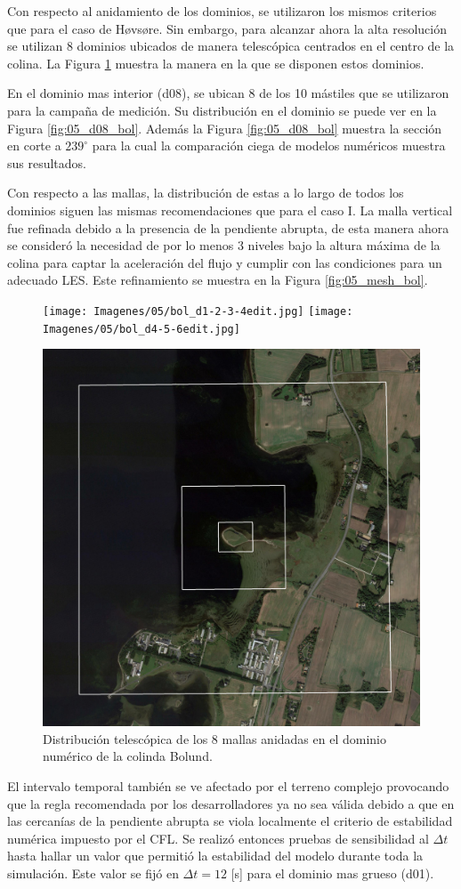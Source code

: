 Con respecto al anidamiento de los dominios, se utilizaron los mismos criterios que para el caso de Høvsøre. Sin embargo, para alcanzar ahora la alta resolución se utilizan 8 dominios ubicados de manera telescópica centrados en el centro de la colina. La Figura \ref{fig:05_dom_bol} muestra la manera en la que se disponen estos dominios.

En el dominio mas interior (d08), se ubican 8 de los 10 mástiles que se utilizaron para la campaña de medición. Su distribución en el dominio se puede ver en la Figura \ref{fig:05_d08_bol}. Además la Figura \ref{fig:05_d08_bol} muestra la sección en corte a $239^\circ$ para la cual la comparación ciega de modelos numéricos muestra sus resultados.

Con respecto a las mallas, la distribución de estas a lo largo de todos los dominios siguen las mismas recomendaciones que para el caso I. La malla vertical fue refinada debido a la presencia de la pendiente abrupta, de esta manera ahora se consideró la necesidad de por lo menos 3 niveles bajo la altura máxima de la colina para captar la aceleración del flujo y cumplir con las condiciones para un adecuado LES. Este refinamiento se muestra en la Figura \ref{fig:05_mesh_bol}.

\begin{figure}[H]
	\centering
	\texttt{[image: Imagenes/05/bol\_d1-2-3-4edit.jpg]}
	\texttt{[image: Imagenes/05/bol\_d4-5-6edit.jpg]}
	
	\bigskip
	\includegraphics[width=0.48\linewidth,page=1,trim={5mm 3mm 3mm 3mm},clip,frame]{Imagenes/05/bol_d6-7-8edit.jpg}%
	
	\caption{Distribución telescópica de los 8 mallas anidadas en el dominio numérico de la colinda Bolund.}
	\label{fig:05_dom_bol}
\end{figure}

El intervalo temporal también se ve afectado por el terreno complejo provocando que la regla recomendada por los desarrolladores ya no sea válida debido a que en las cercanías de la pendiente abrupta se viola localmente el criterio de estabilidad numérica impuesto por el CFL. Se realizó entonces pruebas de sensibilidad al $\Delta t$ hasta hallar un valor que permitió la estabilidad del modelo durante toda la simulación. Este valor se fijó en $\Delta t = 12$ [s] para el dominio mas grueso (d01).


